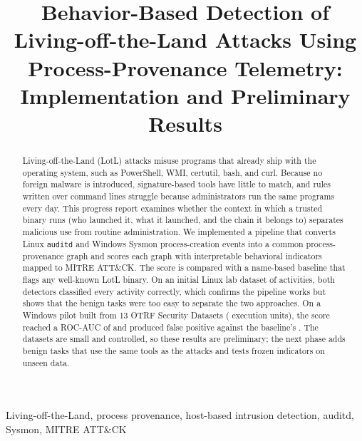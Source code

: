 \documentclass[conference]{IEEEtran}
\begin{document}
\title{Behavior-Based Detection of Living-off-the-Land Attacks Using Process-Provenance Telemetry: Implementation and Preliminary Results}

\author{
}

\maketitle

\begin{abstract}
Living-off-the-Land (LotL) attacks misuse programs that already ship with
the operating system, such as PowerShell, WMI, certutil, bash, and curl.
Because no foreign malware is introduced, signature-based tools have little
to match, and rules written over command lines struggle because
administrators run the same programs every day. This progress report
examines whether the context in which a trusted binary runs (who launched
it, what it launched, and the chain it belongs to) separates malicious use
from routine administration. We implemented a pipeline that converts Linux
\texttt{auditd} and Windows Sysmon process-creation events into a common
process-provenance graph and scores each graph with interpretable behavioral
indicators mapped to MITRE ATT\&CK. The score is compared with a name-based
baseline that flags any well-known LotL binary. On an initial Linux lab
dataset of \LinTotal{} activities, both detectors classified every activity
correctly, which confirms the pipeline works but shows that the benign tasks
were too easy to separate the two approaches. On a Windows pilot built from
13 OTRF Security Datasets (\WinTotal{} execution units), the score reached a
ROC-AUC of \WinAUC{} and produced \WinScoreFP{} false positive against the
baseline's \WinBaseFP{}. The datasets are small and controlled, so these
results are preliminary; the next phase adds benign tasks that use the same
tools as the attacks and tests frozen indicators on unseen data.
\end{abstract}

\begin{IEEEkeywords}
Living-off-the-Land, process provenance, host-based intrusion detection, auditd, Sysmon, MITRE ATT\&CK
\end{IEEEkeywords}

\end{document}
